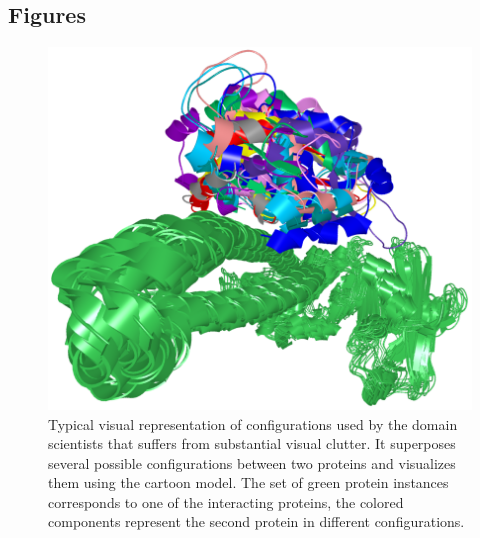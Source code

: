 \documentclass{bmcart}
\begin{document}
\begin{backmatter}




\section*{Figures}
  \begin{figure}[h!]
  \centering
  \includegraphics[width=\columnwidth]{images/figure1.png}
 \caption{
	Typical visual representation of configurations used by the domain scientists that suffers from substantial visual clutter. It superposes several possible configurations between two proteins and visualizes them using the cartoon model. The set of green protein instances corresponds to one of the interacting proteins, the colored components represent the second protein in different configurations.}
  \label{fig:problem}
\end{figure}


\end{backmatter}
\end{document}
